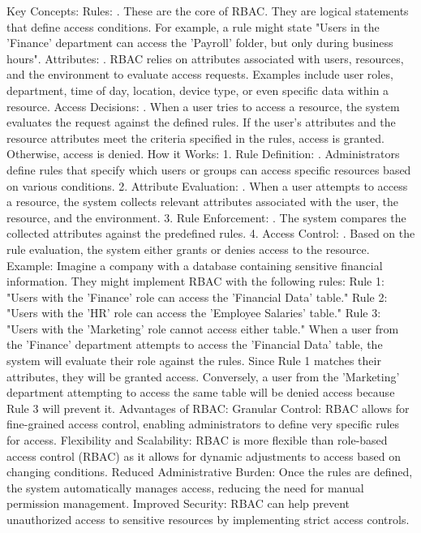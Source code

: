 Key Concepts:
Rules:
.
These are the core of RBAC. They are logical statements that define access conditions. For example, a rule might state "Users in the 'Finance' department can access the 'Payroll' folder, but only during business hours". 
Attributes:
.
RBAC relies on attributes associated with users, resources, and the environment to evaluate access requests. Examples include user roles, department, time of day, location, device type, or even specific data within a resource. 
Access Decisions:
.
When a user tries to access a resource, the system evaluates the request against the defined rules. If the user's attributes and the resource attributes meet the criteria specified in the rules, access is granted. Otherwise, access is denied. 
How it Works:
1. Rule Definition:
.
Administrators define rules that specify which users or groups can access specific resources based on various conditions. 
2. Attribute Evaluation:
.
When a user attempts to access a resource, the system collects relevant attributes associated with the user, the resource, and the environment. 
3. Rule Enforcement:
.
The system compares the collected attributes against the predefined rules. 
4. Access Control:
.
Based on the rule evaluation, the system either grants or denies access to the resource. 
Example:
Imagine a company with a database containing sensitive financial information. They might implement RBAC with the following rules: 
Rule 1: "Users with the 'Finance' role can access the 'Financial Data' table." 
Rule 2: "Users with the 'HR' role can access the 'Employee Salaries' table." 
Rule 3: "Users with the 'Marketing' role cannot access either table." 
When a user from the 'Finance' department attempts to access the 'Financial Data' table, the system will evaluate their role against the rules. Since Rule 1 matches their attributes, they will be granted access. Conversely, a user from the 'Marketing' department attempting to access the same table will be denied access because Rule 3 will prevent it. 
Advantages of RBAC:
Granular Control:
RBAC allows for fine-grained access control, enabling administrators to define very specific rules for access. 
Flexibility and Scalability:
RBAC is more flexible than role-based access control (RBAC) as it allows for dynamic adjustments to access based on changing conditions. 
Reduced Administrative Burden:
Once the rules are defined, the system automatically manages access, reducing the need for manual permission management. 
Improved Security:
RBAC can help prevent unauthorized access to sensitive resources by implementing strict access controls. 

